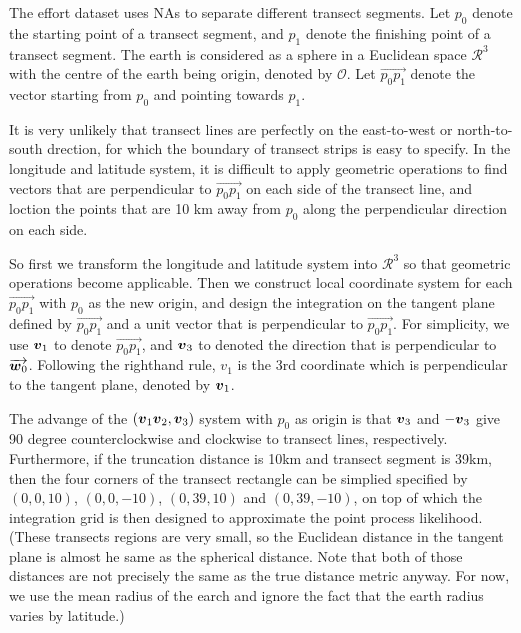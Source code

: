 \documentclass[a4paper]{article}\usepackage[]{graphicx}\usepackage[]{color}
\newcommand{\bm}[1]{\mbox{\boldmath $#1$}}
\begin{document}
The effort dataset uses NAs to separate different transect segments. Let $p_0$ denote the starting point of a transect segment, and $p_1$ denote the finishing point of a transect segment. The earth is considered as a sphere in a Euclidean space 
$\mathcal{R}^3$ with the centre of the earth being origin, denoted by $\mathcal{O}$. Let $\overrightarrow{p_0p_1}$ denote the vector starting from $p_0$ and pointing towards $p_1$.



It is very unlikely that transect lines are perfectly on the east-to-west or north-to-south drection, for which the boundary of transect strips is easy to specify. In the longitude and latitude system, it is difficult to apply geometric operations to find vectors that are perpendicular to $\overrightarrow{p_0p_1}$ on each side of the transect line, and loction the points that are 10 km away from $p_0$ along the perpendicular direction on each side. 

So first we transform the longitude and latitude system into $\mathcal{R}^3$ so that geometric operations become applicable. Then we construct local coordinate system for each $\overrightarrow{p_0p_1}$ with $p_0$ as the new origin, and design the integration on the tangent plane defined by $\overrightarrow{p_0p_1}$ and a unit vector that is perpendicular to $\overrightarrow{p_0p_1}$. For simplicity, we use $\bm{v}_1$ to denote $\overrightarrow{p_0p_1}$, and $\bm{v}_3$ to denoted the direction that is perpendicular to $\overrightarrow{\bm{w}_0}$. Following the righthand rule, $v_1$ is the 3rd coordinate which is perpendicular to the tangent plane, denoted by $\bm{v}_1$. 


The advange of the $(\bm{v}_1\bm{v}_2, \bm{v}_3)$ system with $p_0$ as origin is that $\bm{v}_3$ and $-\bm{v}_3$ give 90 degree counterclockwise and clockwise to transect lines, respectively. Furthermore, if the truncation distance is 10km and transect segment is 39km, then the four corners of the transect rectangle can be simplied specified by $(0,0,10)$, $(0, 0, -10)$, $(0, 39, 10)$ and $(0, 39, -10)$, on top of which the integration grid is then designed to approximate the point process likelihood. (These transects regions are very small, so the Euclidean distance in the tangent plane is almost he same as the spherical distance.  Note that both of those distances are not precisely the same as the true
distance metric anyway. For now, we use the mean radius of the earch and ignore the fact that the earth radius varies by latitude.)
\end{document}
